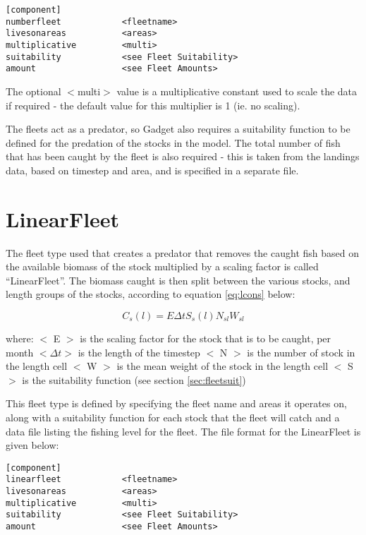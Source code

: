 \documentclass[]{book}
\begin{document}
\begin{verbatim}
[component]
numberfleet            <fleetname>
livesonareas           <areas>
multiplicative         <multi>
suitability            <see Fleet Suitability>
amount                 <see Fleet Amounts>
\end{verbatim}

The optional \(<\)multi\(>\) value is a multiplicative constant used to
scale the data if required - the default value for this multiplier is 1
(ie. no scaling).

The fleets act as a predator, so Gadget also requires a suitability
function to be defined for the predation of the stocks in the model. The
total number of fish that has been caught by the fleet is also required
- this is taken from the landings data, based on timestep and area, and
is specified in a separate file.

\hypertarget{sec:linearfleet}{%
\section{LinearFleet}\label{sec:linearfleet}}

The fleet type used that creates a predator that removes the caught fish
based on the available biomass of the stock multiplied by a scaling
factor is called ``LinearFleet''. The biomass caught is then split between
the various stocks, and length groups of the stocks, according to
equation \eqref{eq:lcons} below:

\begin{equation}
\label{eq:lcons}
C_{s}(l) = E \Delta t S_{s}(l) N_{sl} W_{sl}\end{equation}

where: \(<\) E \(>\) is the scaling factor for the stock that is to be
caught, per month \(<\Delta t>\) is the length of the timestep \(<\) N \(>\)
is the number of stock in the length cell \(<\) W \(>\) is the mean weight
of the stock in the length cell \(<\) S \(>\) is the suitability function
(see section \ref{sec:fleetsuit})

This fleet type is defined by specifying the fleet name and areas it
operates on, along with a suitability function for each stock that the
fleet will catch and a data file listing the fishing level for the
fleet. The file format for the LinearFleet is given below:

\begin{verbatim}
[component]
linearfleet            <fleetname>
livesonareas           <areas>
multiplicative         <multi>
suitability            <see Fleet Suitability>
amount                 <see Fleet Amounts>
\end{verbatim}
\end{document}
